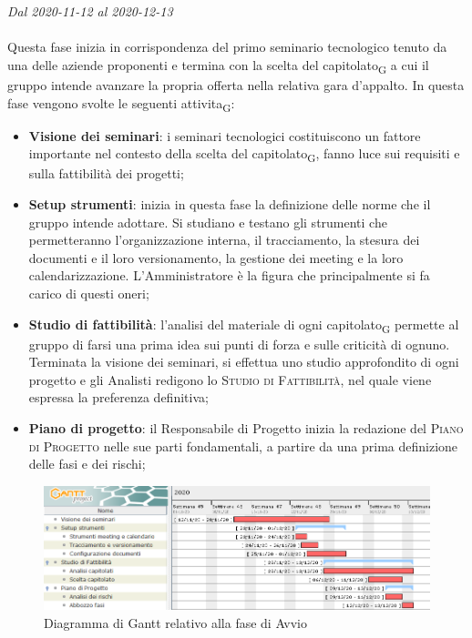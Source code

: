 \textit{Dal 2020-11-12 al 2020-12-13}
\\\\
Questa fase inizia in corrispondenza del primo seminario tecnologico tenuto da una delle aziende proponenti e termina con la scelta del \gls{capitolato}\textsubscript{G} a cui il gruppo intende avanzare la propria offerta nella relativa gara d'appalto.
In questa fase vengono svolte le seguenti \gls{attivita}\textsubscript{G}:
\begin{itemize}
	\item \textbf{Visione dei seminari}: i seminari tecnologici costituiscono un fattore importante nel contesto della scelta del \gls{capitolato}\textsubscript{G}, fanno luce sui requisiti e sulla fattibilità dei progetti;
	\item \textbf{Setup strumenti}: inizia in questa fase la definizione delle norme che il gruppo intende adottare. Si studiano e testano gli strumenti che permetteranno l'organizzazione interna, il tracciamento, la stesura dei documenti e il loro versionamento, la gestione dei meeting e la loro calendarizzazione. L'Amministratore è la figura che principalmente si fa carico di questi oneri;
	\item \textbf{Studio di fattibilità}: l'analisi del materiale di ogni \gls{capitolato}\textsubscript{G} permette al gruppo di farsi una prima idea sui punti di forza e sulle criticità di ognuno. Terminata la visione dei seminari, si effettua uno studio approfondito di ogni progetto e gli Analisti redigono lo \textsc{Studio di Fattibilità}, nel quale viene espressa la preferenza definitiva;
	\item \textbf{Piano di progetto}: il Responsabile di Progetto inizia la redazione del \textsc{Piano di Progetto} nelle sue parti fondamentali, a partire da una prima definizione delle fasi e dei rischi;
\end{itemize}  


\begin{figure}[H]
	\centering
	\includegraphics[scale=0.62]{res/images/01_gantt_avvio.png}
	\caption{Diagramma di Gantt relativo alla fase di Avvio}
\end{figure}




